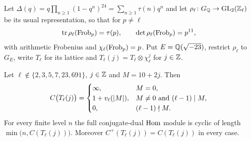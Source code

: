 Let $\Delta(q)=q\prod_{n\ge1}(1-q^n)^{24}=\sum_{n\ge1}\tau(n)q^n$ and let
$\rho_\ell\colon G_{\mathbb{Q}}\to\operatorname{GL}_2(\mathbb{Z}_\ell)$ be its usual representation, so
that for $p\ne\ell$
\[
 \operatorname{tr}\rho_\ell(\operatorname{Frob}_p)=\tau(p),\qquad\det\rho_\ell(\operatorname{Frob}_p)=p^{11},
\]
with arithmetic Frobenius and $\chi_\ell(\operatorname{Frob}_p)=p$. Put
$E=\mathbb{Q}(\sqrt{-23})$, restrict $\rho_\ell$ to $G_E$, write $T_\ell$ for its
lattice and $T_\ell(j)=T_\ell\otimes\chi_\ell^j$ for $j\in\mathbb{Z}$.

\begin{theorem}\label{sel:thm:delta}
Let $\ell\notin\{2,3,5,7,23,691\}$, $j\in\mathbb{Z}$ and $M=10+2j$. Then
\[
 C\bigl(T_\ell(j)\bigr)=
 \begin{cases}
 \infty,&M=0,\\
 1+v_\ell(\lvert M\rvert),&M\ne0\text{ and }(\ell-1)\mid M,\\
 0,&(\ell-1)\nmid M .
 \end{cases}
\]
For every finite level $n$ the full conjugate-dual $\operatorname{Hom}$ module is cyclic
of length $\min\bigl(n,C(T_\ell(j))\bigr)$. Moreover
$C^+(T_\ell(j))=C(T_\ell(j))$ in every case.
\end{theorem}

